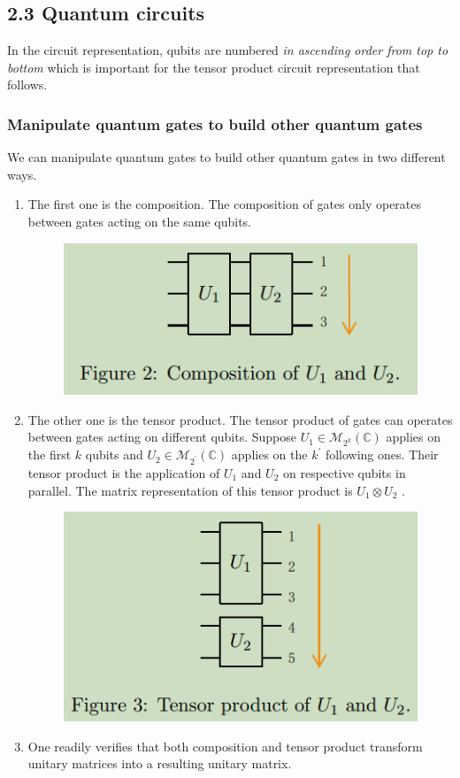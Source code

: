 \subsection{2.3 Quantum circuits}

In the circuit representation, qubits are numbered \textit{in ascending order from top to bottom} which is important for the tensor product circuit representation that follows. %

\subsubsection{Manipulate quantum gates to build other quantum gates}

We can manipulate quantum gates to build other quantum gates in two different ways. 
\begin{enumerate}
    \item The first one is the composition. The composition of gates only operates between gates acting on the same qubits. 
\begin{figure}
    \centering
    \includegraphics[width=0.5\linewidth]{grange2023-1.png}
\end{figure}
    \item The other one is the tensor product. The tensor product of gates can operates between gates acting on different qubits. Suppose $U_{1} \in \mathcal{M}_{2^{k}}(\mathbb{C})$ applies on the first $k$ qubits and $U_{2} \in \mathcal{M}_{2^{\prime}}(\mathbb{C})$ applies on the $k^{\prime}$ following ones. Their tensor product is the application of $U_{1}$ and $U_{2}$ on respective qubits in parallel. The matrix representation of this tensor product is $U_{1} \otimes U_{2}$ . 
\begin{figure}
    \centering
    \includegraphics[width=0.5\linewidth]{grange2023-2.png}
\end{figure}
    \item One readily verifies that both composition and tensor product transform unitary matrices into a resulting unitary matrix.
\end{enumerate}

